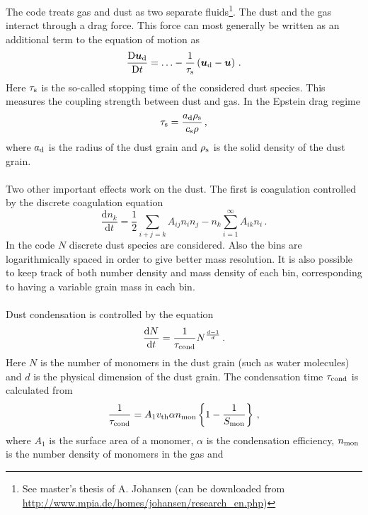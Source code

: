 \documentclass[\mydriver,12pt,twoside,notitlepage,a4paper]{article}
\newcommand{\de}      {\mathrm{d}}
\newcommand{\De}      {\mathrm{D}}
\renewcommand{\vec}[1]{\mbox{\boldmath{$#1$}}}
\begin{document}
The code treats gas and dust as two separate fluids\footnote{See master's
thesis of A. Johansen (can be downloaded from\\
\url{http://www.mpia.de/homes/johansen/research_en.php})}. The dust and the gas
interact through a drag force. This force can most generally be written as an
additional term to the equation of motion as
\begin{equation}
  \frac{\De \vec{u}_{\rm d}}{\De t} = \ldots - \frac{1}{\tau_{\rm s}}
  \left( \vec{u}_{\rm d} - \vec{u} \right)  \, .
\end{equation}
Here $\tau_{\rm s}$ is the so-called stopping time of the considered dust
species. This measures the coupling strength between dust and gas. In the
Epstein drag regime
\begin{equation}
  \tau_{\rm s} = \frac{a_{\rm d} \rho_{\rm s}}{c_{\rm s} \rho} \, ,
\end{equation}
where $a_{\rm d}$ is the radius of the dust grain and $\rho_{\rm s}$ is the
solid density of the dust grain.
\\ \\
Two other important effects work on the dust. The first is coagulation
controlled by the discrete coagulation equation
\begin{equation}
  \frac{\de n_k}{\de t} = \frac{1}{2} \sum_{i+j=k} A_{ij} n_i n_j
  - n_k \sum_{i=1}^\infty A_{ik} n_i \, .
\end{equation}
In the code $N$ discrete dust species are considered. Also the bins are
logarithmically spaced in order to give better mass resolution. It is also
possible to keep track of both number density and mass density of each bin,
corresponding to having a variable grain mass in each bin.
\\ \\
Dust condensation is controlled by the equation
\begin{equation}
  \frac{\de N}{\de t} = \frac{1}{\tau_{\rm cond}} N^{\frac{d-1}{d}} \, .
\end{equation}
Here $N$ is the number of monomers in the dust grain (such as water molecules)
and $d$ is the physical dimension of the dust grain. The condensation time
$\tau_{\rm cond}$ is calculated from
\begin{equation}
  \frac{1}{\tau_{\rm cond}} = A_1 v_{\rm th} \alpha n_{\rm mon}
  \left\{ 1-\frac{1}{S_{\rm mon}} \right\} \, ,
\end{equation}
where $A_1$ is the surface area of a monomer, $\alpha$ is the condensation
efficiency, $n_{\rm mon}$ is the number density of monomers in the gas and
\end{document}
